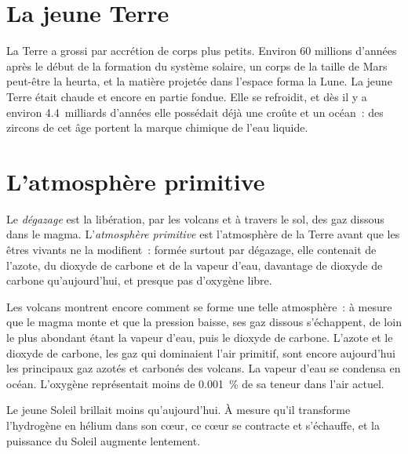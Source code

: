 \section{La jeune Terre}

La Terre a grossi par accrétion de corps plus petits. Environ 60 millions
d'années après le début de la formation du système solaire, un corps de la
taille de Mars peut-être la heurta, et la matière projetée dans l'espace
forma la Lune. La jeune Terre était chaude et encore en partie fondue. Elle
se refroidit, et dès il y a environ 4.4~milliards d'années elle possédait
déjà une croûte et un océan~: des zircons de cet âge portent la marque
chimique de l'eau liquide.

\section{L'atmosphère primitive}

\begin{definition}\label{def:g12:early-earth:primitive-atmosphere}
Le \emph{dégazage} est la libération, par les
volcans et à travers le sol, des gaz dissous dans le magma.
L'\emph{atmosphère primitive}
est l'atmosphère de la Terre avant que les êtres vivants ne la modifient~:
formée surtout par dégazage, elle contenait de l'azote, du dioxyde de
carbone et de la vapeur d'eau, davantage de dioxyde de carbone
qu'aujourd'hui, et presque pas d'oxygène libre.
\end{definition}

Les volcans montrent encore comment se forme une telle atmosphère~: à
mesure que le magma monte et que la pression baisse, ses gaz dissous
s'échappent, de loin le plus abondant étant la vapeur d'eau, puis le dioxyde
de carbone. L'azote et le dioxyde de carbone, les gaz qui dominaient l'air
primitif, sont encore aujourd'hui les principaux gaz azotés et carbonés des
volcans. La vapeur d'eau se condensa en océan. L'oxygène représentait moins
de \qty{0.001}{\percent} de sa teneur dans l'air actuel.

Le jeune Soleil brillait moins qu'aujourd'hui. À mesure qu'il transforme
l'hydrogène en hélium dans son cœur, ce cœur se contracte et s'échauffe, et
la puissance du Soleil augmente lentement.

